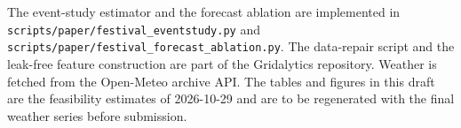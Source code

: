 \documentclass[11pt]{article}
\begin{document}
The event-study estimator and the forecast ablation are implemented in
\texttt{scripts/paper/festival\_eventstudy.py} and
\texttt{scripts/paper/festival\_forecast\_ablation.py}. The data-repair script and
the leak-free feature construction are part of the Gridalytics repository.
Weather is fetched from the Open-Meteo archive API. The tables and figures in this
draft are the feasibility estimates of 2026-10-29 and are to be regenerated with
the final weather series before submission.



\end{document}
